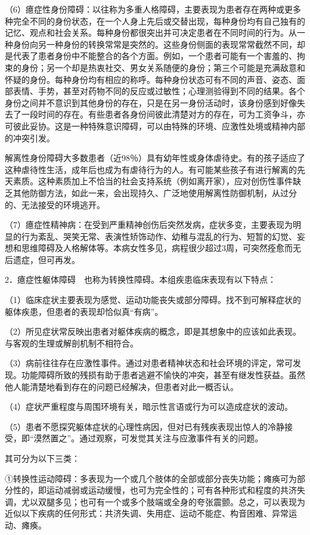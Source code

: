 （6）癔症性身份障碍：以往称为多重人格障碍，主要表现为患者存在两种或更多种完全不同的身份状态，在一个人身上先后或交替出现，每种身份均有自己独有的记忆、观点和社会关系。每种身份都很突出并可决定患者在不同时间的行为。从一种身份向另一种身份的转换常常是突然的。这些身份侧面的表现常常截然不同，却是代表了患者身份中不能整合的各个方面。例如，一个患者可能有一个害羞的、拘束的身份；另一个却是热衷社交、男女关系随便的身份；第三个可能是充满敌意和怀疑的身份。每种身份均有相应的称呼。每种身份状态可有不同的声音、姿态、面部表情、手势，甚至对药物不同的反应或过敏性；心理测验得到不同的结果。各个身份之间并不意识到其他身份的存在，只是在另一身份活动时，该身份感到好像失去了一段时间的存在。有些患者各身份间彼此清楚对方的存在，可为工资争斗，亦可彼此妥协。这是一种特殊意识障碍，可以由特殊的环境、应激性处境或精神内部的冲突引发。

解离性身份障碍大多数患者（近98％）具有幼年性或身体虐待史。有的孩子适应了这种虐待性生活，成年后也成为有虐待行为的人。有可能某些孩子有进行解离的先天素质。这种素质加上不恰当的社会支持系统（例如离开家），应对创伤性事件缺乏其他防御方法，如此一来，会出现持久、广泛地使用解离性防御机制，从过分的、无法接受的环境逃开。

（7）癔症性精神病：在受到严重精神创伤后突然发病，症状多变，主要表现为明显的行为紊乱、哭笑无常、表演性矫饰动作、幼稚与混乱的行为、短暂的幻觉、妄想和思维障碍及人格解体等。本病女性多见，病程很少超过3周，可突然痊愈而无后遗症，但可再发。

2．癔症性躯体障碍　也称为转换性障碍。本组疾患临床表现有以下特点：

（1）临床症状主要表现为感觉、运动功能丧失或部分障碍。找不到可解释症状的躯体疾患，但患者的表现却恰似真“有病”。

（2）所见症状常反映出患者对躯体疾病的概念，即是其想象中的应该如此表现。与客观的生理或解剖机制不相符合。

（3）病前往往存在应激性事件。通过对患者精神状态和社会环境的评定，常可发现。功能障碍所致的残损有助于患者逃避不愉快的冲突，甚至有继发性获益。虽然他人能清楚地看到存在的问题已经解决，但患者对此一概否认。

（4）症状严重程度与周围环境有关，暗示性言语或行为可以造成症状的波动。

（5）患者不愿探究躯体症状的心理性病因，但对已有残疾表现出惊人的冷静接受，即“漠然置之”。通过观察，可发觉其关注与应激事件有关的问题。

其可分为以下三类：

①转换性运动障碍：多表现为一个或几个肢体的全部或部分丧失功能；瘫痪可为部分性的，即运动减弱或运动缓慢，也可为完全性的；可有各种形式和程度的共济失调，尤以双腿多见；也可有一个或多个肢端或全身的夸张震颤。总之，可以表现为近似以下疾病的任何形式：共济失调、失用症、运动不能症、构音困难、异常运动、瘫痪。

